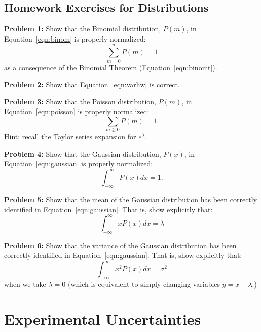 \documentclass[12pt,oneside]{book}
\begin{document}
\newpage
\section{Homework Exercises for Distributions}

\noindent
{\bf Problem 1:} Show that the Binomial distribution, $P(m)$, in Equation~\ref{eqn:binom} is properly normalized:
\begin{displaymath}
\sum_{m=0}^n P(m) = 1
\end{displaymath}
as a consequence of the Binomial Theorem (Equation~\ref{eqn:binomt}).

\vskip 1cm
\noindent
{\bf Problem 2:} Show that Equation~\ref{eqn:varhw} is correct.

\vskip 1cm
\noindent
{\bf Problem 3:} Show that the Poisson distribution, $P(m)$, in Equation~\ref{eqn:poisson} is properly normalized:
\begin{displaymath}
\sum_{m \geq 0} P(m) = 1.
\end{displaymath}
Hint: recall the Taylor series expansion for $e^\lambda$.

\vskip 1cm
\noindent
{\bf Problem 4:} Show that the Gaussian distribution, $P(x)$, in Equation~\ref{eqn:gaussian} is properly normalized:
\begin{displaymath}
\int_{-\infty}^{\infty} P(x) dx = 1.
\end{displaymath}

\vskip 1cm
\noindent
{\bf Problem 5:} Show that the mean of the Gaussian distribution has been correctly identified in Equation~\ref{eqn:gaussian}.  That is, show explicitly that:
\begin{displaymath}
\int_{-\infty}^{\infty} x P(x) dx = \lambda 
\end{displaymath}

\vskip 1cm
\noindent
{\bf Problem 6:} Show that the variance of the Gaussian distribution has been correctly identified in Equation~\ref{eqn:gaussian}.  That is, show explicitly that:
\begin{displaymath}
\int_{-\infty}^{\infty} x^2 P(x) dx = \sigma^2 
\end{displaymath}
when we take $\lambda=0$ (which is equivalent to simply changing variables $y=x-\lambda$.)
   
\newpage

\chapter{Experimental Uncertainties}
\end{document}
